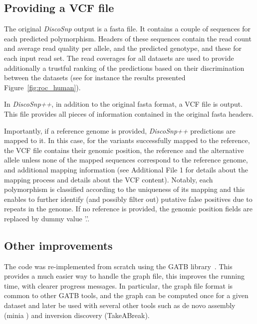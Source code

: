 \documentclass{bmcart}
\newcommand{\disco}{{\it DiscoSnp}\xspace}
\newcommand{\discopp}{{\it DiscoSnp++}\xspace}
\begin{document}
\subsection*{Providing a VCF file}
The original \disco output is a fasta file. It contains a couple of sequences for each predicted polymorphism. Headers of these sequences contain the read count and average read quality per allele, and the predicted genotype, and these for each input read set. 
The read coverages for all datasets are used to provide additionally a trustful ranking of the predictions based on their discrimination between the datasets 
(see for instance the results presented Figure~\ref{fig:roc_human}).

In \discopp, in addition to the original fasta format, a VCF file is output. This file provides all pieces of information contained in the original fasta headers.

Importantly, if a reference genome is provided, \discopp predictions are mapped to it. In this case, for the variants successfully mapped to the reference, the VCF file contains their genomic position, the reference and the alternative allele unless none of the mapped sequences correspond to the reference genome, and additional mapping information (see Additional File 1 for details about the mapping process and details about the VCF content). Notably, each polymorphism is classified according to the uniqueness of its mapping and this enables to further identify (and possibly filter out) putative false positives due to repeats in the genome.
If no reference is provided, the genomic position fields are replaced by dummy value '.'.

\subsection*{Other improvements}
The code was re-implemented from scratch using the GATB library~\cite{Drezen2014}. This provides a much easier way to handle the graph file, this improves the running time, with clearer progress messages. 
In particular, the graph file format is common to other GATB tools, and the graph can be computed once for a given dataset and later be used with several other tools such as de novo assembly (minia \cite{Chikhi2013}) and inversion discovery (TakeABreak\cite{}). 
\end{document}
